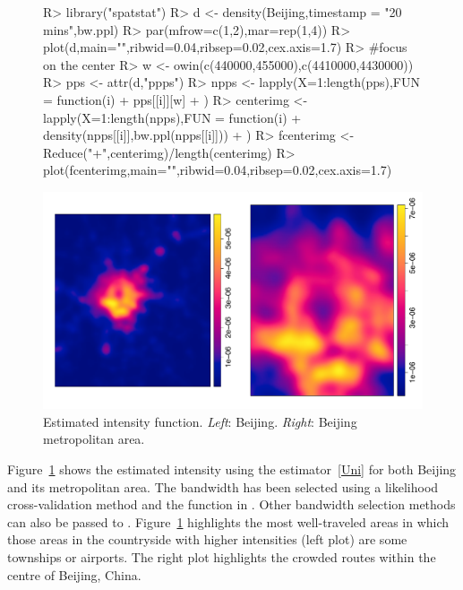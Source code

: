 \documentclass[article]{jss}
\begin{document}
\begin{figure}[!h]
\begin{center}
\begin{Sinput}
R>  library("spatstat")
R>  d <- density(Beijing,timestamp = "20 mins",bw.ppl)
R>  par(mfrow=c(1,2),mar=rep(1,4))
R>  plot(d,main="",ribwid=0.04,ribsep=0.02,cex.axis=1.7)
R>  #focus on the center
R>  w <- owin(c(440000,455000),c(4410000,4430000))
R>  pps <- attr(d,"ppps")
R>  npps <- lapply(X=1:length(pps),FUN = function(i){
+     pps[[i]][w]
+   })
R>  centerimg <- lapply(X=1:length(npps),FUN = function(i){
+     density(npps[[i]],bw.ppl(npps[[i]]))
+   })
R>  fcenterimg <- Reduce("+",centerimg)/length(centerimg)
R>  plot(fcenterimg,main="",ribwid=0.04,ribsep=0.02,cex.axis=1.7)
\end{Sinput}
\includegraphics{article-019}
\end{center}
\caption{Estimated intensity function. \emph{Left}: Beijing. \emph{Right}: Beijing metropolitan area.}
\label{bijingint}
\end{figure}

Figure~\ref{bijingint} shows the estimated intensity using the estimator~\ref{Uni} for both Beijing and its metropolitan area. The bandwidth has been selected using a likelihood cross-validation method and the function  in . Other bandwidth selection methods can also be passed to . Figure~\ref{bijingint} highlights the most well-traveled areas in which those areas in the countryside with higher intensities (left plot) are some townships or airports. The right plot highlights the crowded routes within the centre of Beijing, China.
\end{document}
